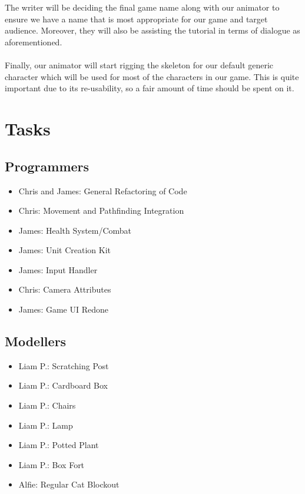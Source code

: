 \documentclass{article}
\begin{document}
\\\\
The writer will be deciding the final game name along with our animator to ensure we have a name that is most appropriate for our game and target audience. Moreover, they will also be assisting the tutorial in terms of dialogue as aforementioned.
\\\\
Finally, our animator will start rigging the skeleton for our default generic character which will be used for most of the characters in our game. This is quite important due to its re-usability, so a fair amount of time should be spent on it.

\section{Tasks}
\subsection{Programmers}
\begin{itemize}
    \item Chris and James: General Refactoring of Code
    \item Chris: Movement and Pathfinding Integration
    \item James: Health System/Combat
    \item James: Unit Creation Kit
    \item James: Input Handler
    \item Chris: Camera Attributes
    \item James: Game UI Redone
\end{itemize}

\subsection{Modellers}
\begin{itemize}
    \item Liam P.: Scratching Post
    \item Liam P.: Cardboard Box
    \item Liam P.: Chairs
    \item Liam P.: Lamp
    \item Liam P.: Potted Plant
    \item Liam P.: Box Fort
    \item Alfie: Regular Cat Blockout
\end{itemize}
\end{document}
